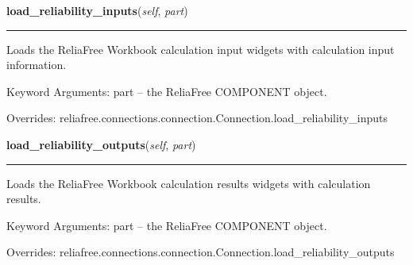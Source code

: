     \vspace{0.5ex}

\hspace{.8\funcindent}\begin{boxedminipage}{\funcwidth}

    \raggedright \textbf{load\_reliability\_inputs}(\textit{self}, \textit{part})

    \vspace{-1.5ex}

    \rule{\textwidth}{0.5\fboxrule}
\setlength{\parskip}{2ex}
    Loads the ReliaFree Workbook calculation input widgets with calculation
    input information.

    Keyword Arguments: part -- the ReliaFree COMPONENT object.

\setlength{\parskip}{1ex}
      Overrides: reliafree.connections.connection.Connection.load\_reliability\_inputs

    \end{boxedminipage}

    \vspace{0.5ex}

\hspace{.8\funcindent}\begin{boxedminipage}{\funcwidth}

    \raggedright \textbf{load\_reliability\_outputs}(\textit{self}, \textit{part})

    \vspace{-1.5ex}

    \rule{\textwidth}{0.5\fboxrule}
\setlength{\parskip}{2ex}
    Loads the ReliaFree Workbook calculation results widgets with 
    calculation results.

    Keyword Arguments: part -- the ReliaFree COMPONENT object.

\setlength{\parskip}{1ex}
      Overrides: reliafree.connections.connection.Connection.load\_reliability\_outputs

    \end{boxedminipage}

    \label{reliafree:connections:multipin:Multipin:calculate_mil_217_count}

    \vspace{0.5ex}


